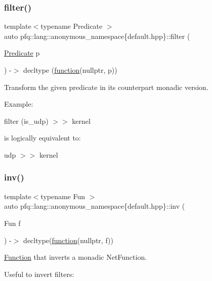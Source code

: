 \subsubsection{\texorpdfstring{filter()}{filter()}}
{\footnotesize\ttfamily template$<$typename Predicate $>$ \\
auto pfq\+::lang\+::anonymous\+\_\+namespace\{default.\+hpp\}\+::filter (\begin{DoxyParamCaption}\item[{\hyperlink{structpfq_1_1lang_1_1Predicate}{Predicate}}]{p }\end{DoxyParamCaption}) -\/$>$ decltype (\hyperlink{namespacepfq_1_1lang_a1a4638059d700ae08d0ca63886ff2bb3}{function}(nullptr, p))
        }



Transform the given predicate in its counterpart monadic version. 

Example\+:

filter (is\+\_\+udp) $>$$>$ kernel

is logically equivalent to\+:

udp $>$$>$ kernel \mbox{\label{namespacepfq_1_1lang_1_1anonymous__namespace_02default_8hpp_03_a5b2869b170967bd1680723a5af1b3fee}} 
\subsubsection{\texorpdfstring{inv()}{inv()}}
{\footnotesize\ttfamily template$<$typename Fun $>$ \\
auto pfq\+::lang\+::anonymous\+\_\+namespace\{default.\+hpp\}\+::inv (\begin{DoxyParamCaption}\item[{Fun}]{f }\end{DoxyParamCaption}) -\/$>$ decltype(\hyperlink{namespacepfq_1_1lang_a1a4638059d700ae08d0ca63886ff2bb3}{function}(nullptr, f))
        }



\hyperlink{structpfq_1_1lang_1_1Function}{Function} that inverts a monadic Net\+Function. 

Useful to invert filters\+:

